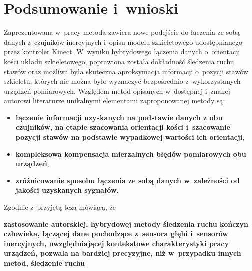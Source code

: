 \chapter{Podsumowanie i~wnioski }\label{chap:finalSummary}

Zaprezentowana w~pracy metoda zawiera nowe podejście do łączenia ze sobą danych z~czujników inercyjnych i~opisu modelu szkieletowego udostępnianego przez kontroler Kinect. W~wyniku hybrydowego łączenia danych o~orientacji kości układu szkieletowego, poprawiona została dokładność śledzenia ruchu stawów oraz możliwa była skuteczna aproksymacja informacji o~pozycji stawów szkieletu, których nie można było wyznaczyć bezpośrednio z~wykorzystanych urządzeń pomiarowych. Względem metod opisanych w~dostępnej i~znanej autorowi literaturze unikalnymi elementami zaproponowanej metody są:
\begin{itemize}
	\item \textbf{łączenie informacji uzyskanych na podstawie danych z obu czujników, na etapie szacowania orientacji kości i~szacowanie pozycji stawów na podstawie wypadkowej wartości ich orientacji},\\
	\item \textbf{kompleksowa kompensacja mierzalnych błędów pomiarowych obu urządzeń}, \\
	\item \textbf{zróżnicowanie sposobu łączenia ze sobą danych w~zależności od jakości uzyskanych sygnałów}.
\end{itemize}


Zgodnie z~przyjętą tezą mówiącą, że

\textbf{zastosowanie autorskiej, hybrydowej metody śledzenia ruchu kończyn człowieka, łączącej dane pochodzące z~sensora głębi i~sensorów inercyjnych, uwzględniającej kontekstowe charakterystyki pracy urządzeń, pozwala na bardziej precyzyjne, niż w~przypadku innych metod, śledzenie ruchu}

